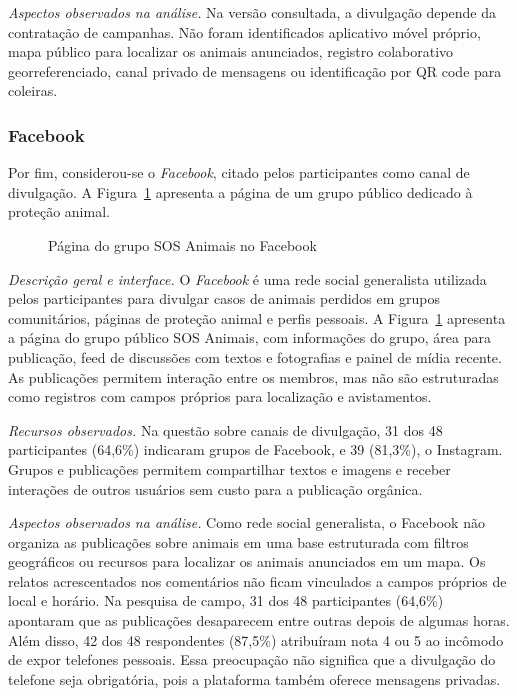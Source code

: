 \vspace{0.25cm}
\noindent \textit{Aspectos observados na análise.} Na versão consultada, a divulgação depende da contratação de campanhas. Não foram identificados aplicativo móvel próprio, mapa público para localizar os animais anunciados, registro colaborativo georreferenciado, canal privado de mensagens ou identificação por QR code para coleiras.


\subsubsection{Facebook}

Por fim, considerou-se o \textit{Facebook}, citado pelos participantes como canal de divulgação. A Figura~\ref{fig:facebook} apresenta a página de um grupo público dedicado à proteção animal.

\begin{figure}[H]
    \centering
    \caption{Página do grupo SOS Animais no Facebook}
    \label{fig:facebook}
\end{figure}

\noindent \textit{Descrição geral e interface.} O \textit{Facebook} é uma rede social generalista utilizada pelos participantes para divulgar casos de animais perdidos em grupos comunitários, páginas de proteção animal e perfis pessoais. A Figura~\ref{fig:facebook} apresenta a página do grupo público SOS Animais, com informações do grupo, área para publicação, feed de discussões com textos e fotografias e painel de mídia recente. As publicações permitem interação entre os membros, mas não são estruturadas como registros com campos próprios para localização e avistamentos.

\vspace{0.25cm}
\noindent \textit{Recursos observados.} Na questão sobre canais de divulgação, 31 dos 48 participantes (64,6\%) indicaram grupos de Facebook, e 39 (81,3\%), o Instagram. Grupos e publicações permitem compartilhar textos e imagens e receber interações de outros usuários sem custo para a publicação orgânica.

\vspace{0.25cm}
\noindent \textit{Aspectos observados na análise.} Como rede social generalista, o Facebook não organiza as publicações sobre animais em uma base estruturada com filtros geográficos ou recursos para localizar os animais anunciados em um mapa. Os relatos acrescentados nos comentários não ficam vinculados a campos próprios de local e horário. Na pesquisa de campo, 31 dos 48 participantes (64,6\%) apontaram que as publicações desaparecem entre outras depois de algumas horas. Além disso, 42 dos 48 respondentes (87,5\%) atribuíram nota 4 ou 5 ao incômodo de expor telefones pessoais. Essa preocupação não significa que a divulgação do telefone seja obrigatória, pois a plataforma também oferece mensagens privadas.

